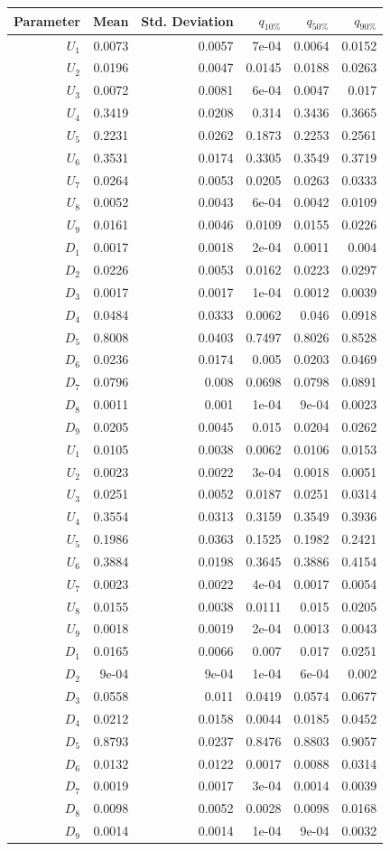 \documentclass[]{article}
\begin{document}
\begin{longtable}[]{@{}rrrrrr@{}}
\toprule
Parameter & Mean & Std. Deviation & \(q_{10\%}\) & \(q_{50\%}\) &
\(q_{90\%}\)\tabularnewline
\midrule
\endhead
\(U_1\) & 0.0073 & 0.0057 & 7e-04 & 0.0064 & 0.0152\tabularnewline
\(U_2\) & 0.0196 & 0.0047 & 0.0145 & 0.0188 & 0.0263\tabularnewline
\(U_3\) & 0.0072 & 0.0081 & 6e-04 & 0.0047 & 0.017\tabularnewline
\(U_4\) & 0.3419 & 0.0208 & 0.314 & 0.3436 & 0.3665\tabularnewline
\(U_5\) & 0.2231 & 0.0262 & 0.1873 & 0.2253 & 0.2561\tabularnewline
\(U_6\) & 0.3531 & 0.0174 & 0.3305 & 0.3549 & 0.3719\tabularnewline
\(U_7\) & 0.0264 & 0.0053 & 0.0205 & 0.0263 & 0.0333\tabularnewline
\(U_8\) & 0.0052 & 0.0043 & 6e-04 & 0.0042 & 0.0109\tabularnewline
\(U_9\) & 0.0161 & 0.0046 & 0.0109 & 0.0155 & 0.0226\tabularnewline
\(D_1\) & 0.0017 & 0.0018 & 2e-04 & 0.0011 & 0.004\tabularnewline
\(D_2\) & 0.0226 & 0.0053 & 0.0162 & 0.0223 & 0.0297\tabularnewline
\(D_3\) & 0.0017 & 0.0017 & 1e-04 & 0.0012 & 0.0039\tabularnewline
\(D_4\) & 0.0484 & 0.0333 & 0.0062 & 0.046 & 0.0918\tabularnewline
\(D_5\) & 0.8008 & 0.0403 & 0.7497 & 0.8026 & 0.8528\tabularnewline
\(D_6\) & 0.0236 & 0.0174 & 0.005 & 0.0203 & 0.0469\tabularnewline
\(D_7\) & 0.0796 & 0.008 & 0.0698 & 0.0798 & 0.0891\tabularnewline
\(D_8\) & 0.0011 & 0.001 & 1e-04 & 9e-04 & 0.0023\tabularnewline
\(D_9\) & 0.0205 & 0.0045 & 0.015 & 0.0204 & 0.0262\tabularnewline
\(U_1\) & 0.0105 & 0.0038 & 0.0062 & 0.0106 & 0.0153\tabularnewline
\(U_2\) & 0.0023 & 0.0022 & 3e-04 & 0.0018 & 0.0051\tabularnewline
\(U_3\) & 0.0251 & 0.0052 & 0.0187 & 0.0251 & 0.0314\tabularnewline
\(U_4\) & 0.3554 & 0.0313 & 0.3159 & 0.3549 & 0.3936\tabularnewline
\(U_5\) & 0.1986 & 0.0363 & 0.1525 & 0.1982 & 0.2421\tabularnewline
\(U_6\) & 0.3884 & 0.0198 & 0.3645 & 0.3886 & 0.4154\tabularnewline
\(U_7\) & 0.0023 & 0.0022 & 4e-04 & 0.0017 & 0.0054\tabularnewline
\(U_8\) & 0.0155 & 0.0038 & 0.0111 & 0.015 & 0.0205\tabularnewline
\(U_9\) & 0.0018 & 0.0019 & 2e-04 & 0.0013 & 0.0043\tabularnewline
\(D_1\) & 0.0165 & 0.0066 & 0.007 & 0.017 & 0.0251\tabularnewline
\(D_2\) & 9e-04 & 9e-04 & 1e-04 & 6e-04 & 0.002\tabularnewline
\(D_3\) & 0.0558 & 0.011 & 0.0419 & 0.0574 & 0.0677\tabularnewline
\(D_4\) & 0.0212 & 0.0158 & 0.0044 & 0.0185 & 0.0452\tabularnewline
\(D_5\) & 0.8793 & 0.0237 & 0.8476 & 0.8803 & 0.9057\tabularnewline
\(D_6\) & 0.0132 & 0.0122 & 0.0017 & 0.0088 & 0.0314\tabularnewline
\(D_7\) & 0.0019 & 0.0017 & 3e-04 & 0.0014 & 0.0039\tabularnewline
\(D_8\) & 0.0098 & 0.0052 & 0.0028 & 0.0098 & 0.0168\tabularnewline
\(D_9\) & 0.0014 & 0.0014 & 1e-04 & 9e-04 & 0.0032\tabularnewline
\bottomrule
\end{longtable}
\end{document}
